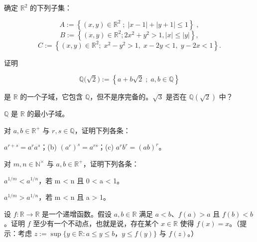 \begin{exercises}
\item

确定 $ \mathbb{R}^{2} $ 的下列子集：

\[
A:=\left\{(x,y)\in\mathbb{R}^{2}\;;\;|x-1|+|y+1|\leq1\right\}\;,
\]
\[
B:=\left\{(x,y)\in\mathbb{R}^{2};2x^{2}+y^{2}>1,|x|\leq|y|\right\},
\]
\[
C:=\left\{(x,y)\in\mathbb{R}^{2};\;x^{2}-y^{2}>1,\;x-2y<1,\;y-2x<1\right\}.
\]
\item

\begin{items}
\item

证明

\[
\mathbb{Q}\bigl(\sqrt{2}\bigr):=\left\{a+b\sqrt{2}\;;\;a,b\in\mathbb{Q}\right\}
\]

是 $ \mathbb{R} $ 的一个子域，它包含 $ \mathbb{Q} $，但不是序完备的。$ \sqrt{3} $ 是否在 $ \mathbb{Q}(\sqrt{2}) $ 中？

\item

\proofhead
$ \mathbb{Q} $ 是 $ \mathbb{R} $ 的最小子域。
\end{items}

\item

对 $ a, b \in \mathbb{R}^+ $ 与 $ r, s \in \mathbb{Q} $，证明下列各条：

\begin{items}
\item

$ a^{r+s} = a^ra^s $；(b)  $ (a^r)^s = a^{rs} $；(c)  $ a^rb^r = (ab)^r $。

\end{items}

\item

对 $ m, n \in \mathbb{N}^\times $ 与 $ a, b \in \mathbb{R}^+ $，证明下列各条：

\begin{items}
\item

$ a^{1/m} < a^{1/n} $，若 m < n 且 0 < a < 1。

\item

$ a^{1/m} > a^{1/n} $，若 m < n 且 a > 1。

\end{items}

\item

设 $ f: \mathbb{R} \to \mathbb{R} $ 是一个递增函数。假设 $ a, b \in \mathbb{R} $ 满足 $ a < b $、$ f(a) > a $ 且 $ f(b) < b $。证明 $ f $ 至少有一个不动点，也就是说，存在某个 $ x \in \mathbb{R} $ 使得 $ f(x) = x $。（提示：考虑 $ z := \sup\{y \in \mathbb{R} : a \leq y \leq b $，$ y \leq f(y)\} $ 与 $ f(z) $。）


\end{exercises}
